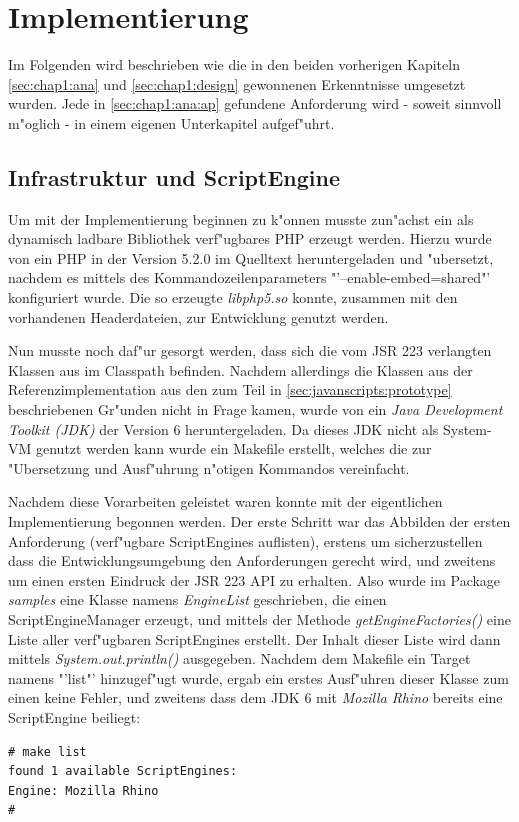 
\section{Implementierung}
\label{sec:chap1:impl}

Im Folgenden wird beschrieben wie die in den beiden vorherigen Kapiteln \ref{sec:chap1:ana} und \ref{sec:chap1:design}
gewonnenen Erkenntnisse umgesetzt wurden. Jede in \ref{sec:chap1:ana:ap} gefundene Anforderung wird - soweit sinnvoll
m"oglich - in einem eigenen Unterkapitel aufgef"uhrt.

\subsection{Infrastruktur und ScriptEngine}
\label{sec:chap1:impl:1}

Um mit der Implementierung beginnen zu k"onnen musste zun"achst ein als dynamisch ladbare Bibliothek verf"ugbares
PHP erzeugt werden. Hierzu wurde von \cite{PHPHP} ein PHP in der Version 5.2.0 im Quelltext heruntergeladen und 
"ubersetzt, nachdem es mittels des Kommandozeilenparameters "'--enable-embed=shared"' konfiguriert wurde. Die so
erzeugte \emph{libphp5.so} konnte, zusammen mit den vorhandenen Headerdateien, zur Entwicklung genutzt werden.

Nun musste noch daf"ur gesorgt werden, dass sich die vom JSR 223 verlangten Klassen aus  im
Classpath befinden. Nachdem allerdings die Klassen aus der Referenzimplementation aus den zum Teil in 
\ref{sec:javanscripts:prototype} beschriebenen Gr"unden nicht in Frage kamen, wurde von \cite{JAVAHP} ein
\emph{Java Development Toolkit (JDK)} der Version 6 heruntergeladen. Da dieses JDK nicht als System-VM genutzt
werden kann wurde ein Makefile erstellt, welches die zur "Ubersetzung und Ausf"uhrung n"otigen Kommandos
vereinfacht.

Nachdem diese Vorarbeiten geleistet waren konnte mit der eigentlichen Implementierung begonnen werden.
Der erste Schritt war das Abbilden der ersten Anforderung (verf"ugbare ScriptEngines auflisten), erstens um 
sicherzustellen dass die Entwicklungsumgebung den Anforderungen gerecht wird, und zweitens um einen ersten
Eindruck der JSR 223 API zu erhalten. Also wurde im Package \emph{samples} eine Klasse namens
\emph{EngineList} geschrieben, die einen ScriptEngineManager erzeugt, und mittels der Methode
\emph{getEngineFactories()} eine Liste aller verf"ugbaren ScriptEngines erstellt. Der Inhalt dieser
Liste wird dann mittels \emph{System.out.println()} ausgegeben. 
Nachdem dem Makefile ein Target namens "'list"' hinzugef"ugt wurde, ergab ein erstes Ausf"uhren dieser Klasse
zum einen keine Fehler, und zweitens dass dem JDK 6 mit \emph{Mozilla Rhino} bereits eine ScriptEngine beiliegt:
\begin{lstlisting}[caption=erste Tests]
# make list
found 1 available ScriptEngines:
Engine: Mozilla Rhino
#
\end{lstlisting}

